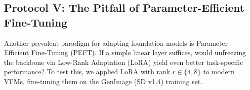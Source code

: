 \documentclass[sigconf,screen]{acmart}
\theoremstyle{plain}
\theoremstyle{definition}
\theoremstyle{remark}
\begin{document}

\subsection{Protocol V: The Pitfall of Parameter-Efficient Fine-Tuning}
\label{subsec:ablation_lora}

Another prevalent paradigm for adapting foundation models is Parameter-Efficient Fine-Tuning (PEFT). If a simple linear layer suffices, would unfreezing the backbone via Low-Rank Adaptation (LoRA) yield even better task-specific performance? To test this, we applied LoRA with rank $r \in \{4, 8\}$ to modern VFMs, fine-tuning them on the GenImage (SD v1.4) training set.

\begin{table}[ht]
\centering
\caption{\textbf{LoRA Fine-Tuning vs. Frozen Linear Probe.} Unfreezing the backbone via LoRA significantly degrades generalization in the wild. Best results in \textbf{bold}.}
\label{tab:lora_ablation}
\vspace{-10pt}
\end{table}
\end{document}
